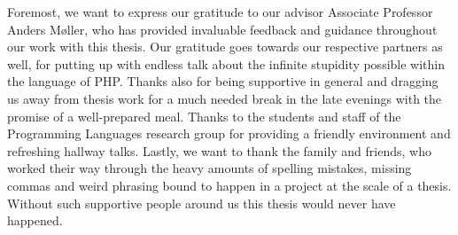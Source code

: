 Foremost, we want to express our gratitude to our advisor Associate Professor Anders Møller, who has provided invaluable feedback and guidance throughout our work with this thesis. Our gratitude goes towards our respective partners as well, for putting up with endless talk about the infinite stupidity possible within the language of PHP. Thanks also for being supportive in general and dragging us away from thesis work for a much needed break in the late evenings with the promise of a well-prepared meal. Thanks to the students and staff of the Programming Languages research group for providing a friendly environment and refreshing hallway talks. Lastly, we want to thank the family and friends, who worked their way through the heavy amounts of spelling mistakes, missing commas and weird phrasing bound to happen in a project at the scale of a thesis. Without such supportive people around us this thesis would never have happened.